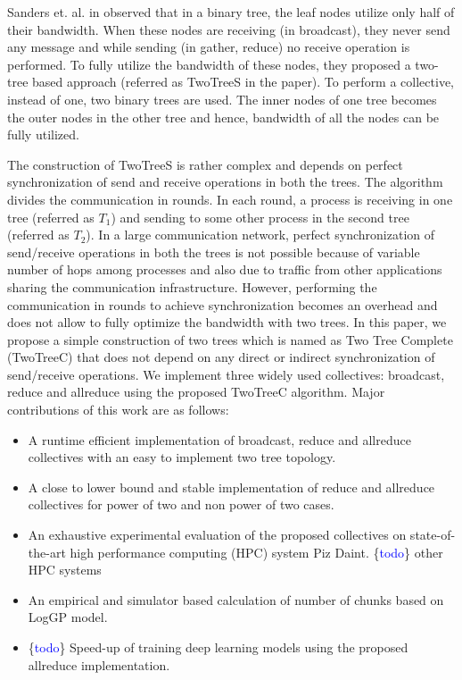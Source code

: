 \documentclass[sigplan,review,anonymous]{acmart}\settopmatter{printfolios=true,printccs=false,printacmref=false}
\begin{document}
Sanders et. al. in \cite{sanders_two-tree_2009} observed that in a binary tree, the leaf nodes utilize only half of their bandwidth. When these nodes are receiving (in broadcast), they never send any message and while sending (in gather, reduce) no receive operation is performed. To fully utilize the bandwidth of these nodes, they proposed a two-tree based approach (referred as TwoTreeS in the paper). To perform a collective, instead of one, two binary trees are used. The inner nodes of one tree becomes the outer nodes in the other tree and hence, bandwidth of all the nodes can be fully utilized. 

The construction of TwoTreeS is rather complex and depends on perfect synchronization of send and receive operations in both the trees. The algorithm divides the communication in rounds. In each round, a process is receiving in one tree (referred as $T_1$) and sending to some other process in the second tree (referred as $T_2$). In a large communication network, perfect synchronization of send/receive operations in both the trees is not possible because of variable number of hops among processes and also due to traffic from other applications sharing the communication infrastructure. However, performing the communication in rounds to achieve synchronization becomes an overhead and does not allow to fully optimize the bandwidth with two trees. In this paper, we propose a simple construction of two trees which is named as Two Tree Complete (TwoTreeC) that does not depend on any direct or indirect synchronization of send/receive operations. We implement three widely used collectives: broadcast, reduce and allreduce using the proposed TwoTreeC algorithm. Major contributions of this work are as follows:

\begin{itemize}
\item A runtime efficient implementation of broadcast, reduce and allreduce collectives with an easy to implement two tree topology.
\item A close to lower bound and stable implementation of reduce and allreduce collectives for power of two and non power of two cases.
\item An exhaustive experimental evaluation of the proposed collectives on state-of-the-art high performance computing (HPC) system Piz Daint. \ifcmts \{\textcolor{blue}{todo}\} other HPC systems \fi
\item An empirical and simulator based calculation of number of chunks based on LogGP \cite{alexandrov_loggp:_1995} model.
\ifcmts \item \{\textcolor{blue}{todo}\} Speed-up of training deep learning models using the proposed allreduce implementation. \fi
\end{itemize}
\end{document}
